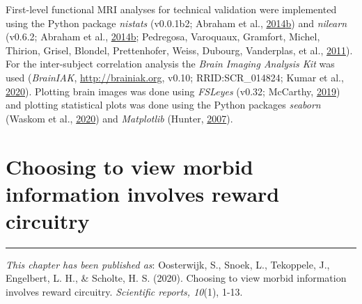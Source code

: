 \documentclass[11pt,american,]{memoir} %
\begin{document}
First-level functional MRI analyses for technical validation were implemented using the Python package \emph{nistats} (v0.0.1b2; Abraham et al., \protect\hyperlink{ref-Abraham2014-ef}{2014}\protect\hyperlink{ref-Abraham2014-ef}{b}) and \emph{nilearn} (v0.6.2; Abraham et al., \protect\hyperlink{ref-Abraham2014-ef}{2014}\protect\hyperlink{ref-Abraham2014-ef}{b}; Pedregosa, Varoquaux, Gramfort, Michel, Thirion, Grisel, Blondel, Prettenhofer, Weiss, Dubourg, Vanderplas, et al., \protect\hyperlink{ref-Pedregosa2011-bp}{2011}). For the inter-subject correlation analysis the \emph{Brain Imaging Analysis Kit} was used (\emph{BrainIAK}, \url{http://brainiak.org}, v0.10; RRID:SCR\_014824; Kumar et al., \protect\hyperlink{ref-Kumar2020-eo}{2020}). Plotting brain images was done using \emph{FSLeyes} (v0.32; McCarthy, \protect\hyperlink{ref-McCarthy2019-yt}{2019}) and plotting statistical plots was done using the Python packages \emph{seaborn} (Waskom et al., \protect\hyperlink{ref-Waskom2020-qq}{2020}) and \emph{Matplotlib} (Hunter, \protect\hyperlink{ref-Hunter2007-at}{2007}).

\hypertarget{morbid-curiosity}{%
\chapter{Choosing to view morbid information involves reward circuitry}\label{morbid-curiosity}}


\vspace*{\fill}

\begin{center}\rule{0.5\linewidth}{0.5pt}\end{center}

\small

\noindent
\emph{This chapter has been published as}: Oosterwijk, S., Snoek, L., Tekoppele, J., Engelbert, L. H., \& Scholte, H. S. (2020). Choosing to view morbid information involves reward circuitry. \emph{Scientific reports, 10}(1), 1-13.

\newpage
\normalsize
\end{document}
